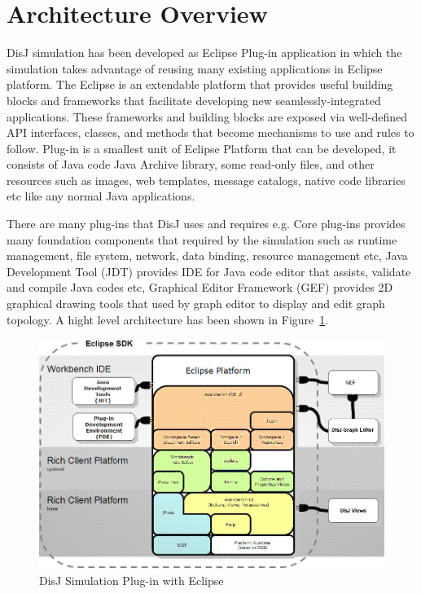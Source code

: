 
\section{Architecture Overview}

DisJ simulation has been developed as Eclipse Plug-in application in which the simulation takes advantage of reusing many existing applications in Eclipse platform. The Eclipse is an extendable platform that provides useful building blocks and frameworks that facilitate developing new seamlessly-integrated applications. These frameworks and building blocks are exposed via well-defined API interfaces, classes, and methods that become mechanisms to use and rules to follow. Plug-in is a smallest unit of Eclipse Platform that can be developed, it consists of Java code Java Archive library, some read-only files, and other resources such as images, web templates, message catalogs, native code libraries etc like any normal Java applications.

There are many plug-ins that DisJ uses and requires e.g. Core plug-ins provides many foundation components that required by the simulation such as runtime management, file system, network, data binding, resource management etc, Java Development Tool (JDT) provides IDE for Java code editor that assists, validate and compile Java codes etc, Graphical Editor Framework (GEF) provides 2D graphical drawing tools that used by graph editor to display and edit graph topology. A hight level architecture has been shown in Figure~{\ref{pic:fig40}}.

\begin{figure}[ht!]
\includegraphics[width=1.0\textwidth,keepaspectratio]{./figure40}
\caption{DisJ Simulation Plug-in with Eclipse}
\label{pic:fig40}
\end{figure}


